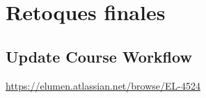 \section{Retoques finales}
\subsection{Update Course Workflow}
\url{https://elumen.atlassian.net/browse/EL-4524}